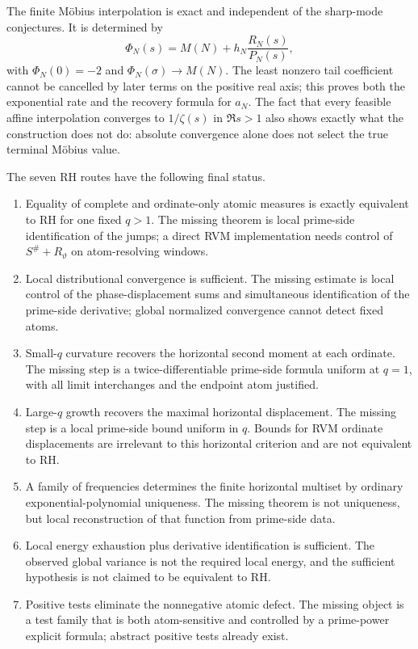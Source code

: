 \documentclass[11pt]{amsart}
\numberwithin{equation}{section}
\theoremstyle{plain}
\theoremstyle{definition}
\theoremstyle{remark}
\newcommand{\1}{\mathbf{1}}
\begin{document}
The finite Möbius interpolation is exact and independent of the sharp-mode
conjectures.  It is determined by
\begin{equation}
\Phi_N(s)
=
M(N)+h_N\frac{R_N(s)}{P_N(s)},
\label{eq:conclusion_Phi}
\end{equation}
with $\Phi_N(0)=-2$ and $\Phi_N(\sigma)\to M(N)$.  The least nonzero tail
coefficient cannot be cancelled by later terms on the positive real axis;
this proves both the exponential rate and the recovery formula for $a_N$.
The fact that every feasible affine interpolation converges to
$1/\zeta(s)$ in $\Re s>1$ also shows exactly what the construction does not
do: absolute convergence alone does not select the true terminal Möbius
value.

The seven RH routes have the following final status.
\begin{enumerate}[label=\textup{Route \Roman*.}]
\item Equality of complete and ordinate-only atomic measures is exactly
equivalent to RH for one fixed $q>1$.  The missing theorem is local
prime-side identification of the jumps; a direct RVM implementation needs
control of $S^{\#}+R_\vartheta$ on atom-resolving windows.
\item Local distributional convergence is sufficient.  The missing estimate
is local control of the phase-displacement sums and simultaneous
identification of the prime-side derivative; global normalized convergence
cannot detect fixed atoms.
\item Small-$q$ curvature recovers the horizontal second moment at each
ordinate.  The missing step is a twice-differentiable prime-side formula
uniform at $q=1$, with all limit interchanges and the endpoint atom
justified.
\item Large-$q$ growth recovers the maximal horizontal displacement.  The
missing step is a local prime-side bound uniform in $q$.  Bounds for RVM
ordinate displacements are irrelevant to this horizontal criterion and are
not equivalent to RH.
\item A family of frequencies determines the finite horizontal multiset by
ordinary exponential-polynomial uniqueness.  The missing theorem is not
uniqueness, but local reconstruction of that function from prime-side data.
\item Local energy exhaustion plus derivative identification is sufficient.
The observed global variance is not the required local energy, and the
sufficient hypothesis is not claimed to be equivalent to RH.
\item Positive tests eliminate the nonnegative atomic defect.  The missing
object is a test family that is both atom-sensitive and controlled by a
prime-power explicit formula; abstract positive tests already exist.
\end{enumerate}
\end{document}
